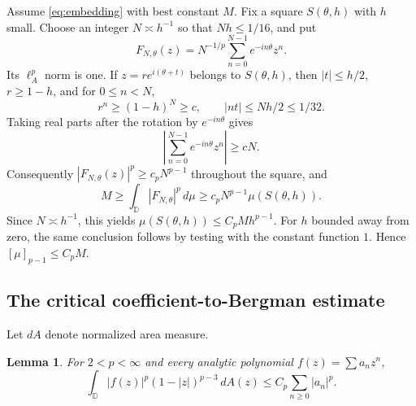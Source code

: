 \documentclass[11pt]{article}
\newtheorem{lemma}[theorem]{Lemma}
\newcommand{\D}{\mathbb D}
\newcommand{\dd}{\,d}
\begin{document}
Assume \eqref{eq:embedding} with best constant $M$.  Fix a square
$S(\theta,h)$ with $h$ small.  Choose an integer $N\asymp h^{-1}$ so that
$Nh\leq 1/16$, and put
\[
 F_{N,\theta}(z)=N^{-1/p}\sum_{n=0}^{N-1}e^{-in\theta}z^n.
\]
Its $\ell_A^p$ norm is one.  If $z=re^{i(\theta+t)}$ belongs to
$S(\theta,h)$, then $|t|\leq h/2$, $r\geq1-h$, and for $0\leq n<N$,
\[
 r^n\geq(1-h)^N\geq c,
 \qquad |nt|\leq Nh/2\leq1/32.
\]
Taking real parts after the rotation by $e^{-in\theta}$ gives
\[
 \left|\sum_{n=0}^{N-1}e^{-in\theta}z^n\right|\geq cN.
\]
Consequently $|F_{N,\theta}(z)|^p\geq c_pN^{p-1}$ throughout the square, and
\[
 M\geq\int_{\D}|F_{N,\theta}|^p\dd\mu
 \geq c_pN^{p-1}\mu(S(\theta,h)).
\]
Since $N\asymp h^{-1}$, this yields
$\mu(S(\theta,h))\leq C_pMh^{p-1}$.  For $h$ bounded away from zero, the
same conclusion follows by testing with the constant function $1$.  Hence
$[\mu]_{p-1}\leq C_pM$.

\subsection*{The critical coefficient-to-Bergman estimate}

Let $dA$ denote normalized area measure.

\begin{lemma}\label{lem:bergman}
For $2<p<\infty$ and every analytic polynomial
$f(z)=\sum a_nz^n$,
\begin{equation}\label{eq:critical-bergman}
 \int_{\D}|f(z)|^p(1-|z|)^{p-3}\dd A(z)
 \leq C_p\sum_{n\geq0}|a_n|^p.
\end{equation}
\end{lemma}
\end{document}
